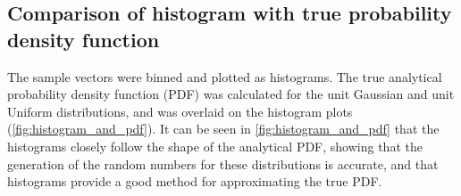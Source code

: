 \documentclass[a4paper]{article}
\begin{document}

\subsection{Comparison of histogram with true probability density function}

The sample vectors were binned and plotted as histograms.
The true analytical probability density function (PDF) was calculated for the unit Gaussian and unit Uniform
distributions, and was overlaid on the histogram plots (\autoref{fig:histogram_and_pdf}).
It can be seen in \autoref{fig:histogram_and_pdf} that the histograms closely follow the shape of the analytical PDF,
showing that the generation of the random numbers for these distributions is accurate, and that histograms provide a
good method for approximating the true PDF.
\end{document}
